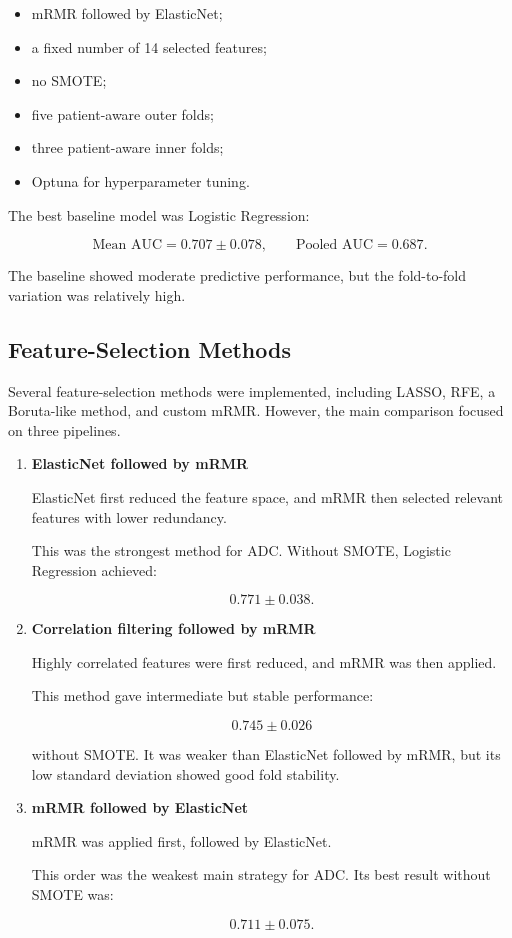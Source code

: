 \documentclass[10pt,a4paper]{article}
\begin{document}
\begin{itemize}[leftmargin=1.5em]
    \item mRMR followed by ElasticNet;
    \item a fixed number of 14 selected features;
    \item no SMOTE;
    \item five patient-aware outer folds;
    \item three patient-aware inner folds;
    \item Optuna for hyperparameter tuning.
\end{itemize}

The best baseline model was Logistic Regression:

\[
\text{Mean AUC} = 0.707 \pm 0.078,
\qquad
\text{Pooled AUC} = 0.687.
\]

The baseline showed moderate predictive performance, but the fold-to-fold variation was relatively high.

\subsection{Feature-Selection Methods}

Several feature-selection methods were implemented, including LASSO, RFE, a Boruta-like method, and custom mRMR. However, the main comparison focused on three pipelines.

\begin{enumerate}[leftmargin=1.7em]
    \item \textbf{ElasticNet followed by mRMR}

    ElasticNet first reduced the feature space, and mRMR then selected relevant features with lower redundancy.

    This was the strongest method for ADC. Without SMOTE, Logistic Regression achieved:

    \[
    0.771 \pm 0.038.
    \]

    \item \textbf{Correlation filtering followed by mRMR}

    Highly correlated features were first reduced, and mRMR was then applied.

    This method gave intermediate but stable performance:

    \[
    0.745 \pm 0.026
    \]

    without SMOTE. It was weaker than ElasticNet followed by mRMR, but its low standard deviation showed good fold stability.

    \item \textbf{mRMR followed by ElasticNet}

    mRMR was applied first, followed by ElasticNet.

    This order was the weakest main strategy for ADC. Its best result without SMOTE was:

    \[
    0.711 \pm 0.075.
    \]
\end{enumerate}
\end{document}
